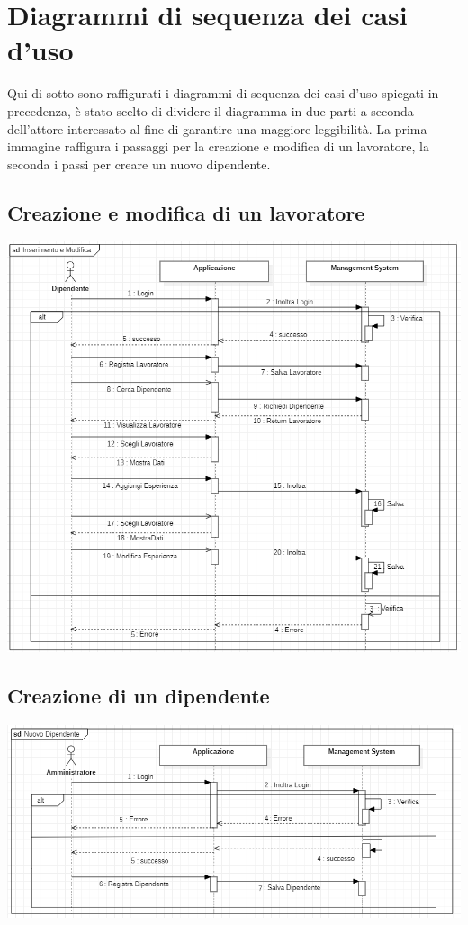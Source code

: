 \documentclass[ 4paper,11pt,openany]{book}
\begin{document}
\section{Diagrammi di sequenza dei casi d'uso}
Qui di sotto sono raffigurati i diagrammi di sequenza dei casi d'uso spiegati in precedenza, è stato scelto di dividere il diagramma in due parti a seconda dell'attore interessato al fine di garantire una maggiore leggibilità. La prima immagine raffigura i passaggi per la creazione e modifica di un lavoratore, la seconda i passi per creare un nuovo dipendente.
\subsection{Creazione e modifica di un lavoratore}
\includegraphics[width=180mm]{seq.png}
\subsection{Creazione di un dipendente}
\includegraphics[width=180mm]{seq2.png}
\end{document}
